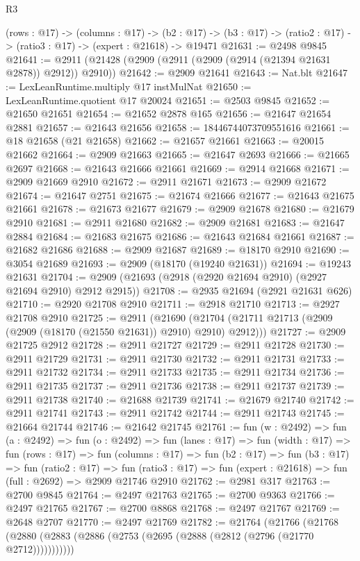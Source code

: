 \begin{lexlean}{R3}
\begin{coremodule}
  (rows : @17) ->
  (columns : @17) ->
  (b2 : @17) -> (b3 : @17) -> (ratio2 : @17) -> (ratio3 : @17) -> (expert : @21618) -> @19471
@21631 := @2498 @9845
@21641 := @2911 (@21428 (@2909 (@2911 (@2909 (@2914 (@21394 @21631 @2878)) @2912)) @2910))
@21642 := @2909 @21641
@21643 := Nat.blt
@21647 := LexLeanRuntime.multiply @17 instMulNat
@21650 := LexLeanRuntime.quotient @17 @20024
@21651 := @2503 @9845
@21652 := @21650 @21651
@21654 := @21652 @2878 @165
@21656 := @21647 @21654 @2881
@21657 := @21643 @21656
@21658 := 18446744073709551616
@21661 := @18 @21658 (@21 @21658)
@21662 := @21657 @21661
@21663 := @20015 @21662
@21664 := @2909 @21663
@21665 := @21647 @2693
@21666 := @21665 @2697
@21668 := @21643 @21666 @21661
@21669 := @2914 @21668
@21671 := @2909 @21669 @2910
@21672 := @2911 @21671
@21673 := @2909 @21672
@21674 := @21647 @2751
@21675 := @21674 @21666
@21677 := @21643 @21675 @21661
@21678 := @21673 @21677
@21679 := @2909 @21678
@21680 := @21679 @2910
@21681 := @2911 @21680
@21682 := @2909 @21681
@21683 := @21647 @2884
@21684 := @21683 @21675
@21686 := @21643 @21684 @21661
@21687 := @21682 @21686
@21688 := @2909 @21687
@21689 := @18170 @2910
@21690 := @3054 @21689
@21693 := @2909 (@18170 (@19240 @21631))
@21694 := @19243 @21631
@21704 := @2909 (@21693 (@2918 (@2920 @21694 @2910) (@2927 @21694 @2910) @2912 @2915))
@21708 := @2935 @21694 (@2921 @21631 @626)
@21710 := @2920 @21708 @2910
@21711 := @2918 @21710
@21713 := @2927 @21708 @2910
@21725 := @2911
    (@21690 (@21704 (@21711 @21713 (@2909 (@2909 (@18170 (@21550 @21631)) @2910) @2910) @2912)))
@21727 := @2909 @21725 @2912
@21728 := @2911 @21727
@21729 := @2911 @21728
@21730 := @2911 @21729
@21731 := @2911 @21730
@21732 := @2911 @21731
@21733 := @2911 @21732
@21734 := @2911 @21733
@21735 := @2911 @21734
@21736 := @2911 @21735
@21737 := @2911 @21736
@21738 := @2911 @21737
@21739 := @2911 @21738
@21740 := @21688 @21739
@21741 := @21679 @21740
@21742 := @2911 @21741
@21743 := @2911 @21742
@21744 := @2911 @21743
@21745 := @21664 @21744
@21746 := @21642 @21745
@21761 := fun (w : @2492) =>
  fun (a : @2492) =>
  fun (o : @2492) =>
  fun (lanes : @17) =>
  fun (width : @17) =>
  fun (rows : @17) =>
  fun (columns : @17) =>
  fun (b2 : @17) =>
  fun (b3 : @17) =>
  fun (ratio2 : @17) =>
  fun (ratio3 : @17) => fun (expert : @21618) => fun (full : @2692) => @2909 @21746 @2910
@21762 := @2981 @317
@21763 := @2700 @9845
@21764 := @2497 @21763
@21765 := @2700 @9363
@21766 := @2497 @21765
@21767 := @2700 @8868
@21768 := @2497 @21767
@21769 := @2648 @2707
@21770 := @2497 @21769
@21782 := @21764
    (@21766 (@21768 (@2880 (@2883 (@2886 (@2753 (@2695 (@2888 (@2812 (@2796 (@21770 @2712)))))))))))

\end{coremodule}
\end{lexlean}
